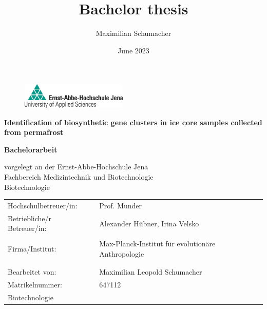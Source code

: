 \documentclass[12pt, a4paper]{scrreprt}
\title{Bachelor thesis}
\author{Maximilian Schumacher}
\date{June 2023}
\begin{document}
\begin{titlepage}
    \begin{figure}
        \hfill
        \includegraphics[width=0.45\textwidth]{Logo_EAH.jpg}
        \label{fig:eah_logo}
    \end{figure}
    \begin{center}
        \vspace*{2cm}

        \LARGE
        \textbf{Identification of biosynthetic gene clusters in ice core samples collected from permafrost}

        \vspace{2cm}
        \large
        \textbf{Bachelorarbeit}

        \vspace{2cm}
        \normalsize
        vorgelegt an der Ernst-Abbe-Hochschule Jena \\
        Fachbereich Medizintechnik und Biotechnologie\\
        \vspace{0.5cm}
        Biotechnologie
    \end{center}
    \vfill
    \begin{table}[b]
        \begin{tabular}{l l}
            Hochschulbetreuer/in:       & Prof. Munder                                       \\
            Betriebliche/r Betreuer/in: & Alexander Hübner, Irina Velsko                     \\
                                        &                                                    \\
            Firma/Institut:             & Max-Planck-Institut für evolutionäre Anthropologie \\
                                        &                                                    \\
                                        &                                                    \\
            Bearbeitet von:             & Maximilian Leopold Schumacher                      \\
            Matrikelnummer:             & 647112                                             \\
            Biotechnologie              &                                                    \\
        \end{tabular}
    \end{table}
\end{titlepage}
\end{document}
